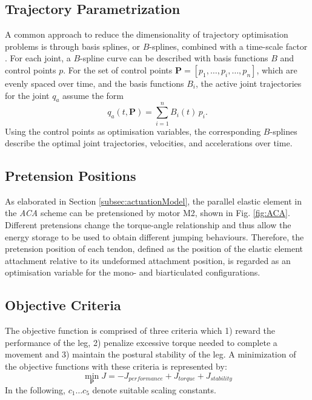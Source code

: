 \documentclass[letterpaper, 10 pt, conference]{ieeeconf}  %
\begin{document}
\subsection{Trajectory Parametrization} 
\label{subsec:trajectoryParametrization}
A common approach to reduce the dimensionality of trajectory optimisation problems is through basis splines, or $B$-splines, combined with a time-scale factor \cite{ude2000planning,babivc2009biarticulated,wang1999weight,albro2001optimal}. For each joint, a $B$-spline curve can be described with basis functions $B$ and control points $p$. For the set of control points $\mathbf{P}=\left[p_1,\dots,p_i,\dots,p_n\right]$, which are evenly spaced over time, and the basis functions $B_i$, the active joint trajectories for the joint $q_a$ assume the form
\begin{equation}
	q_a(t,\mathbf{P}) = \sum_{i=1}^{n} B_i (t) \, p_i.
\end{equation}
Using the control points as optimisation variables, the corresponding $B$-splines describe the optimal joint trajectories, velocities, and accelerations over time. 

\subsection{Pretension Positions} 
\label{subsec:pretensionPositions}
As elaborated in Section \ref{subsec:actuationModel}, the parallel elastic element in the \textit{ACA} scheme can be pretensioned by motor M2, shown in Fig. \ref{fig:ACA}. Different pretensions change the torque-angle relationship and thus allow the energy storage to be used to obtain different jumping behaviours. Therefore, the pretension position of each tendon, defined as the position of the elastic element attachment relative to its undeformed attachment position, is regarded as an optimisation variable for the mono- and biarticulated configurations.

\subsection{Objective Criteria} 
\label{subsec:objectiveCriteria}
The objective function is comprised of three criteria which 1) reward the performance of the leg, 2) penalize excessive torque needed to complete a movement and 3) maintain the postural stability of the leg. A minimization of the objective functions with these criteria is represented by:
\begin{equation}
	\min_{\mathbf{p}} J = -J_{performance} + J_{torque} + J_{stability}
\end{equation}
In the following, $c_1 \dots c_5$ denote suitable scaling constants.
\end{document}
